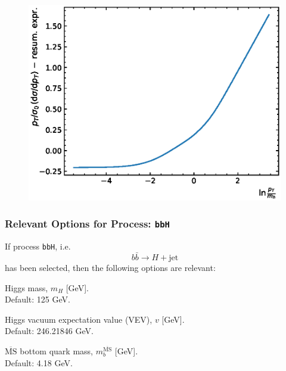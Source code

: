 \documentclass[12pt,a4wide]{article}
\begin{document}
\begin{figure}[tbh]
\begin{minipage}{.485\textwidth}
  \includegraphics[width=\linewidth]{figures/sushitestlog}
  \label{fig:sushitestlog}
\end{minipage}
\end{figure}

\subsubsection{Relevant Options for Process: \texttt{bbH}}
If process \texttt{bbH}, i.e.\ 
\begin{equation}
	b\bar{b} \rightarrow H + \text{jet}
\end{equation}
has been selected, then the following options are relevant: 
\begin{description}[labelindent=\parindent, labelwidth =\widthof{\bfseries9999999999999999999999}, leftmargin = !] 
	\item[\texttt{--mH <value>}] Higgs mass, $m_H$ [GeV]. \\ Default: 125 GeV. 
	\item[\texttt{--vev <value>}] Higgs vacuum expectation value (VEV), $v$ [GeV]. \\ Default: 246.21846 GeV. 
	\item[\texttt{--mbmb <value>}] $\overline{\text{MS}}$ bottom quark mass, $m_b^{\overline{\text{MS}}}$ [GeV]. \\ Default: 4.18 GeV. 
\end{description}
\end{document}
